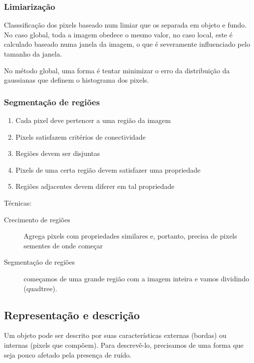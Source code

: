 \documentclass[twocolumn, 10pt]{article}
\begin{document}
\subsubsection*{Limiarização}
\label{sec:orge93a0e5}
Classsificação dos pixels baseado num limiar que os separada em objeto e fundo.
No caso global, toda a imagem obedece o mesmo valor, no caso local, este é calculado baseado numa janela da imagem, o que é severamente influenciado pelo tamanho da janela.

No método global, uma forma é tentar minimizar o erro da distribuição da gaussianas que definem o histograma dos pixels.

\subsubsection*{Segmentação de regiões}
\label{sec:orge54069e}
\begin{enumerate}
\item Cada pixel deve pertencer a uma região da imagem
\item Pixels satisfazem critérios de conectividade
\item Regiões devem ser disjuntas
\item Pixels de uma certa região devem satisfazer uma propriedade
\item Regiões adjacentes devem diferer em tal propriedade
\end{enumerate}

Técnicas:
\begin{description}
\item[{Crecimento de regiões}] Agrega pixels com propriedades similares e, portanto, precisa de pixels sementes de onde começar
\item[{Segmentação de regiões}] começamos de uma grande região com a imagem inteira e vamos dividindo (quadtree).
\end{description}

\subsection*{Representação e descrição}
\label{sec:org11156c3}
Um objeto pode ser descrito por suas características externas (bordas) ou internas (pixels que compõem).
Para descrevê-lo, precisamos de uma forma que seja pouco afetado pela presença de ruído.
\end{document}
